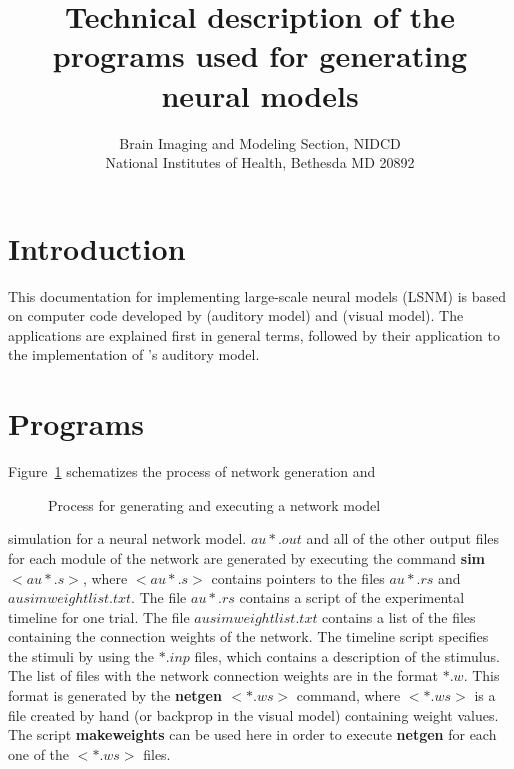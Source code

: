 \documentclass[12pt]{article}
\title{Technical description of the programs used for 
       generating neural models}
\author{Brain Imaging and Modeling Section, NIDCD \\
        National Institutes of Health, 
	Bethesda MD 20892
	}
\begin{document}

\maketitle

\section{Introduction}
This documentation for implementing large-scale neural models (LSNM)
is based on computer code developed by
\cite{HusHor02} (auditory model) and \cite{TagHor98} (visual model).
The applications are explained first in general terms, followed by
their application to the implementation of \cite{HusHor02}'s auditory
model.

\section{Programs}
Figure~\ref{lsnm} schematizes the process of network generation and
\begin{figure}[htp]
  \centerline{}
  \caption{Process for generating and executing a network model}
  \label{lsnm}
\end{figure}
simulation for a neural network model. 
$au*.out$ and all of the other output files for each module of the
network are generated by executing the command {\bf sim $<au*.s>$},
where $<au*.s>$ contains pointers to the files $au*.rs$ and
$ausimweightlist.txt$. The file $au*.rs$ contains a script of the
experimental timeline for one trial. The file $ausimweightlist.txt$
contains a list of the files containing the connection weights of the
network. The timeline script specifies the stimuli by using the
$*.inp$ files, which contains a description of the stimulus. The list
of files with the network connection weights are in the format
$*.w$. This format is generated by the {\bf netgen $<*.ws>$} command,
where $<*.ws>$ is a file created by hand (or backprop in the visual
model) containing weight values. The script {\bf makeweights} can be
used here in order to execute {\bf netgen} for each one of the
$<*.ws>$ files. 
 
\end{document}
